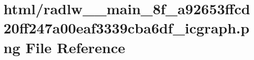 \hypertarget{radlw____main__8f__a92653ffcd20ff247a00eaf3339cba6df__icgraph_8png}{}\section{html/radlw\+\_\+\+\_\+main\+\_\+8f\+\_\+a92653ffcd20ff247a00eaf3339cba6df\+\_\+icgraph.png File Reference}
\label{radlw____main__8f__a92653ffcd20ff247a00eaf3339cba6df__icgraph_8png}
